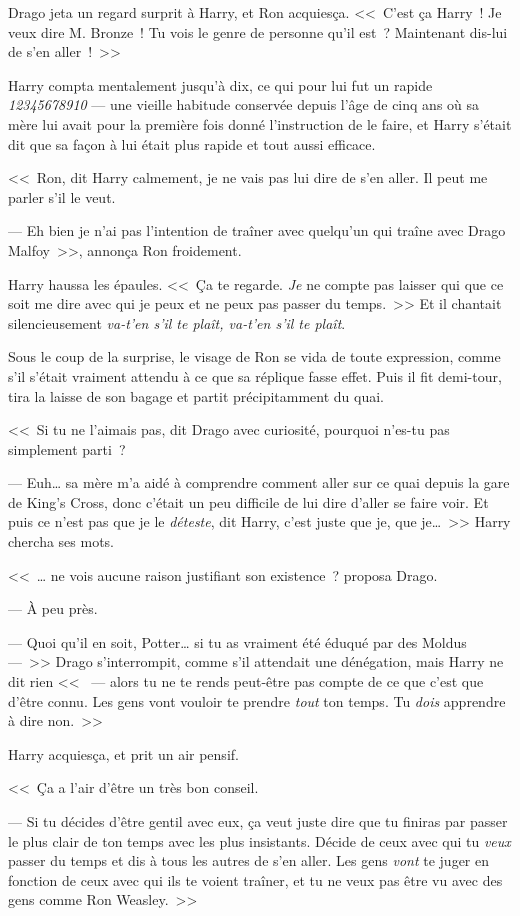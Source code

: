 Drago jeta un regard surprit à Harry, et Ron acquiesça. <<~C'est ça Harry~! Je veux dire M. Bronze~! Tu vois le genre de personne qu'il est~? Maintenant dis-lui de s'en aller~!~>>

Harry compta mentalement jusqu'à dix, ce qui pour lui fut un rapide \emph{12345678910} — une vieille habitude conservée depuis l'âge de cinq ans où sa mère lui avait pour la première fois donné l'instruction de le faire, et Harry s'était dit que sa façon à lui était plus rapide et tout aussi efficace.

<<~Ron, dit Harry calmement, je ne vais pas lui dire de s'en aller. Il peut me parler s'il le veut.

--- Eh bien je n'ai pas l'intention de traîner avec quelqu'un qui traîne avec Drago Malfoy~>>, annonça Ron froidement.

Harry haussa les épaules. <<~Ça te regarde. \emph{Je} ne compte pas laisser qui que ce soit me dire avec qui je peux et ne peux pas passer du temps.~>> Et il chantait silencieusement \emph{va-t'en s'il te plaît, va-t'en s'il te plaît}.

Sous le coup de la surprise, le visage de Ron se vida de toute expression, comme s'il s'était vraiment attendu à ce que sa réplique fasse effet. Puis il fit demi-tour, tira la laisse de son bagage et partit précipitamment du quai.

<<~Si tu ne l'aimais pas, dit Drago avec curiosité, pourquoi n'es-tu pas simplement parti~?

--- Euh… sa mère m'a aidé à comprendre comment aller sur ce quai depuis la gare de King's Cross, donc c'était un peu difficile de lui dire d'aller se faire voir. Et puis ce n'est pas que je le \emph{déteste}, dit Harry, c'est juste que je, que je…~>> Harry chercha ses mots.

<<~… ne vois aucune raison justifiant son existence~? proposa Drago.

--- À peu près.

--- Quoi qu'il en soit, Potter… si tu as vraiment été éduqué par des Moldus —~>> Drago s'interrompit, comme s'il attendait une dénégation, mais Harry ne dit rien <<~ — alors tu ne te rends peut-être pas compte de ce que c'est que d'être connu. Les gens vont vouloir te prendre \emph{tout} ton temps. Tu \emph{dois} apprendre à dire non.~>>

Harry acquiesça, et prit un air pensif.

<<~Ça a l'air d'être un très bon conseil.

--- Si tu décides d'être gentil avec eux, ça veut juste dire que tu finiras par passer le plus clair de ton temps avec les plus insistants. Décide de ceux avec qui tu \emph{veux} passer du temps et dis à tous les autres de s'en aller. Les gens \emph{vont} te juger en fonction de ceux avec qui ils te voient traîner, et tu ne veux pas être vu avec des gens comme Ron Weasley.~>>

